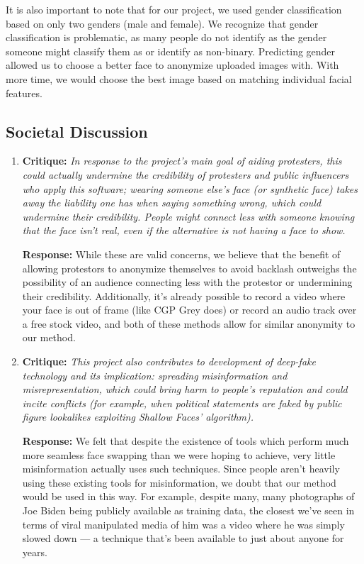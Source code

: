 It is also important to note that for our project, we used gender classification based on only two genders (male and female). We recognize that gender classification is problematic,
as many people do not identify as the gender someone might classify them as or identify as non-binary. Predicting gender allowed us to choose a better face to anonymize uploaded images
with. With more time, we would choose the best image based on matching individual facial features.

\subsection{Societal Discussion}

\begin{enumerate}
    \item \textbf{Critique:} \textit{In response to the project’s main goal of aiding protesters, this could actually
    undermine the credibility of protesters and public influencers who apply this
    software; wearing someone else’s face (or synthetic face) takes away the liability
    one has when saying something wrong, which could undermine their credibility.
    People might connect less with someone knowing that the face isn’t real, even if
    the alternative is not having a face to show.}

    \textbf{Response:} While these are valid concerns, we believe that the benefit of allowing protestors to anonymize themselves
    to avoid backlash outweighs the possibility of an audience connecting less with the protestor or undermining their credibility. Additionally, it's already possible to record a video where your face is out of frame (like CGP Grey does) or record an audio track over a free stock video, and both of these methods allow for similar anonymity to our method.

    \item \textbf{Critique:} \textit{This project also contributes to development of deep-fake technology and its implication: spreading misinformation
    and misrepresentation, which could bring harm to people’s reputation and could incite conflicts (for example, when political statements are faked by public figure lookalikes exploiting Shallow Faces’ algorithm).}

    \textbf{Response:} We felt that despite the existence of tools which perform much more seamless face swapping than we were hoping to achieve, very little misinformation actually uses such techniques. Since people aren't heavily using these existing tools for misinformation, we doubt that our method would be used in this way.
    For example, despite many, many photographs of Joe Biden being publicly available as training data, the closest we've seen in terms of viral manipulated media of him was a video where he was simply slowed down — a technique that's been available to just about anyone for years.


\end{enumerate}
